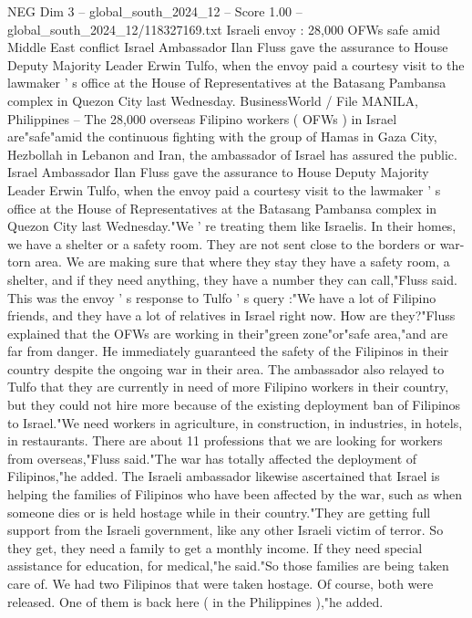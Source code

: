\begin{textsample}{NEG Dim 3 – global\_south\_2024\_12 – Score 1.00 – global\_south\_2024\_12/118327169.txt}  \label{ex:f3_neg_063}
Israeli envoy : 28,000 OFWs safe amid Middle East conflict Israel Ambassador Ilan Fluss gave the assurance to House Deputy Majority Leader Erwin Tulfo, when the envoy paid a courtesy visit to the lawmaker ' s office at the House of Representatives at the Batasang Pambansa complex in Quezon City last Wednesday.
BusinessWorld / File MANILA, Philippines -- The 28,000 overseas Filipino workers ( OFWs ) in Israel are"safe"amid the continuous fighting with the group of Hamas in Gaza City, Hezbollah in Lebanon and Iran, the ambassador of Israel has assured the public.
Israel Ambassador Ilan Fluss gave the assurance to House Deputy Majority Leader Erwin Tulfo, when the envoy paid a courtesy visit to the lawmaker ' s office at the House of Representatives at the Batasang Pambansa complex in Quezon City last Wednesday."We ' re treating them like Israelis.
In their homes, we have a shelter or a safety room.
They are not sent close to the borders or war-torn area.
We are making sure that where they stay they have a safety room, a shelter, and if they need anything, they have a number they can call,"Fluss said.
This was the envoy ' s response to Tulfo ' s query :"We have a lot of Filipino friends, and they have a lot of relatives in Israel right now.
How are they?"Fluss explained that the OFWs are working in their"green zone"or"safe area,"and are far from danger.
He immediately guaranteed the safety of the Filipinos in their country despite the ongoing war in their area.
The ambassador also relayed to Tulfo that they are currently in need of more Filipino workers in their country, but they could not hire more because of the existing deployment ban of Filipinos to Israel."We need workers in agriculture, in construction, in industries, in hotels, in restaurants.
There are about 11 professions that we are looking for workers from overseas,"Fluss said."The war has totally affected the deployment of Filipinos,"he added.
The Israeli ambassador likewise ascertained that Israel is helping the families of Filipinos who have been affected by the war, such as when someone dies or is held hostage while in their country."They are getting full support from the Israeli government, like any other Israeli victim of terror.
So they get, they need a family to get a monthly income.
If they need special assistance for education, for medical,"he said."So those families are being taken care of.
We had two Filipinos that were taken hostage.
Of course, both were released.
One of them is back here ( in the Philippines ),"he added.

\end{textsample}
